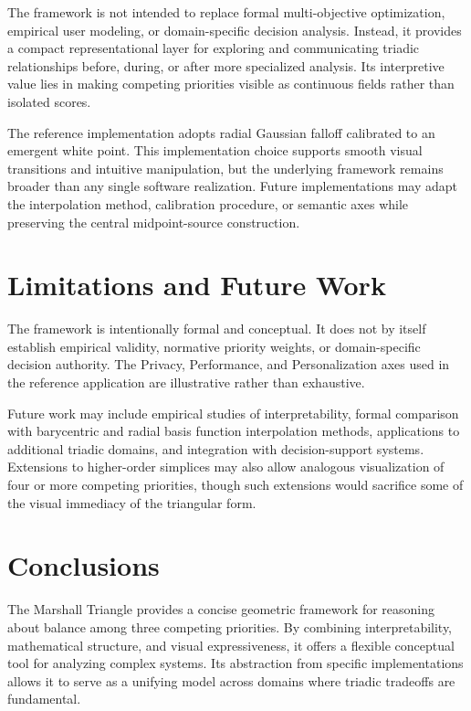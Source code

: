 \documentclass[preprints,article,submit,pdftex,oneauthor]{Definitions/mdpi}
\begin{document}
The framework is not intended to replace formal multi-objective optimization, empirical user modeling, or domain-specific decision analysis. Instead, it provides a compact representational layer for exploring and communicating triadic relationships before, during, or after more specialized analysis. Its interpretive value lies in making competing priorities visible as continuous fields rather than isolated scores.

The reference implementation adopts radial Gaussian falloff calibrated to an emergent white point. This implementation choice supports smooth visual transitions and intuitive manipulation, but the underlying framework remains broader than any single software realization. Future implementations may adapt the interpolation method, calibration procedure, or semantic axes while preserving the central midpoint-source construction.

\section{Limitations and Future Work}

The framework is intentionally formal and conceptual. It does not by itself establish empirical validity, normative priority weights, or domain-specific decision authority. The Privacy, Performance, and Personalization axes used in the reference application are illustrative rather than exhaustive.

Future work may include empirical studies of interpretability, formal comparison with barycentric and radial basis function interpolation methods, applications to additional triadic domains, and integration with decision-support systems. Extensions to higher-order simplices may also allow analogous visualization of four or more competing priorities, though such extensions would sacrifice some of the visual immediacy of the triangular form.

\section{Conclusions}

The Marshall Triangle provides a concise geometric framework for reasoning about balance among three competing priorities. By combining interpretability, mathematical structure, and visual expressiveness, it offers a flexible conceptual tool for analyzing complex systems. Its abstraction from specific implementations allows it to serve as a unifying model across domains where triadic tradeoffs are fundamental.
\end{document}
